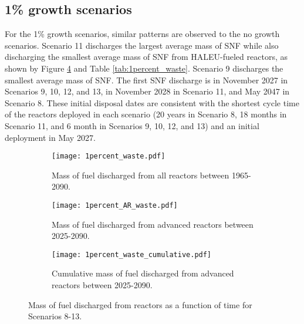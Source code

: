 \subsection{1\% growth scenarios}
For the 1\% growth scenarios, similar patterns are observed to the 
no growth scenarios. Scenario 11 discharges  
the largest average mass of \gls{SNF} while also discharging
the smallest average mass of \gls{SNF} from \gls{HALEU}-fueled 
reactors, as shown by  
Figure \ref{fig:1percent_waste} and Table \ref{tab:1percent_waste}. 
Scenario 9 discharges the smallest average mass of \gls{SNF}. The 
first \gls{SNF} discharge 
is in November 2027 in Scenarios 9, 10, 12, and 13, in 
November 2028 in Scenario 11, and May 2047 in Scenario 8. These initial 
disposal dates are consistent with the shortest cycle time of the 
reactors deployed in each scenario (20 years in Scenario 8, 18 months in 
Scenario 11, and 6 month in Scenarios 9, 10, 12, and 13) and an 
initial deployment in May 2027. 

\begin{figure}[h!]
    \centering
    \begin{subfigure}[b]{0.45\textwidth}
        \centering
        \texttt{[image: 1percent\_waste.pdf]}
        \caption{Mass of fuel discharged from all reactors between 
        1965-2090.}
        \label{fig:1percent_all_waste}
    \end{subfigure}
    \hfill
    \begin{subfigure}[b]{0.45\textwidth}
        \centering
        \texttt{[image: 1percent\_AR\_waste.pdf]}
        \caption{Mass of fuel discharged from advanced reactors 
        between 2025-2090.}
        \label{fig:1percent_AR_waste}
    \end{subfigure}
    \begin{subfigure}[b]{0.45\textwidth}
        \centering
        \texttt{[image: 1percent\_waste\_cumulative.pdf]}
        \caption{Cumulative mass of fuel discharged from advanced reactors 
        between 2025-2090.}
        \label{fig:1percent_waste_cumulative}
    \end{subfigure}
       \caption{Mass of fuel discharged from reactors 
       as a function of time for Scenarios 8-13. }
       \label{fig:1percent_waste}
\end{figure}

